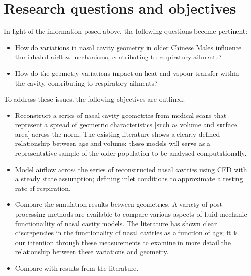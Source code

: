 \section{Research questions and objectives}

In light of the information posed above, the following questions become pertinent:

\begin{itemize}

  \item How do variations in nasal cavity geometry in older Chinese Males influence the inhaled airflow mechanisms, contributing to respiratory ailments?

  \item How do the geometry variations impact on heat and vapour transfer within the cavity, contributing to respiratory ailments?

\end{itemize}

To address these issues, the following objectives are outlined:

\begin{itemize}

  \item Reconstruct a series of nasal cavity geometries from medical scans that represent a spread of geometric characteristics [such as volume and surface area] across the norm. The existing literature shows a clearly defined relationship between age and volume: these models will serve as a representative sample of the older population to be analysed computationally.

  \item Model airflow across the series of reconstructed nasal cavities using CFD with a steady state assumption; defining inlet conditions to approximate a resting rate of respiration. 

  \item Compare the simulation results between geometries. A variety of post processing methods are available to compare various aspects of fluid mechanic functionaility of nasal cavity models. The literature has shown clear discrepencies in the functionality of nasal cavities as a function of age; it is our intention through these measurements to examine in more detail the relationship between these variations and geometry.

  \item  Compare with results from the literature. 
\end{itemize}
 
